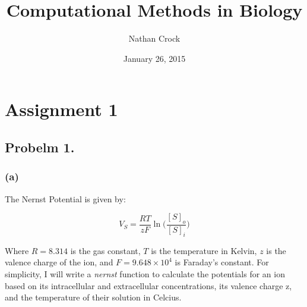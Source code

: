 \documentclass[letterpaper,10pt,english]{/usr/share/sphinx/texinputs/sphinxhowto}
\title{Computational Methods in Biology}
\date{January 26, 2015}
\author{Nathan Crock}
\begin{document}
        
            \maketitle
        

        


        
\section{Assignment 1}\label{computational-methods-in-biology---assignment-1}

\subsection{Probelm 1.}\label{probelm-1.}

\subsubsection{(a)}\label{a}

The Nernst Potential is given by:

\[V_S = \frac{RT}{zF}\ln\bigg(\frac{[S]_o}{[S]_i}\bigg)\]

Where $R=8.314$ is the gas constant, $T$ is the temperature in Kelvin,
$z$ is the valence charge of the ion, and $F=9.648\times10^4$ is
Faraday's constant. For simplicity, I will write a \emph{nernst}
function to calculate the potentials for an ion based on its
intracellular and extracellular concentrations, its valence charge z,
and the temperature of their solution in Celcius.

\end{document}
